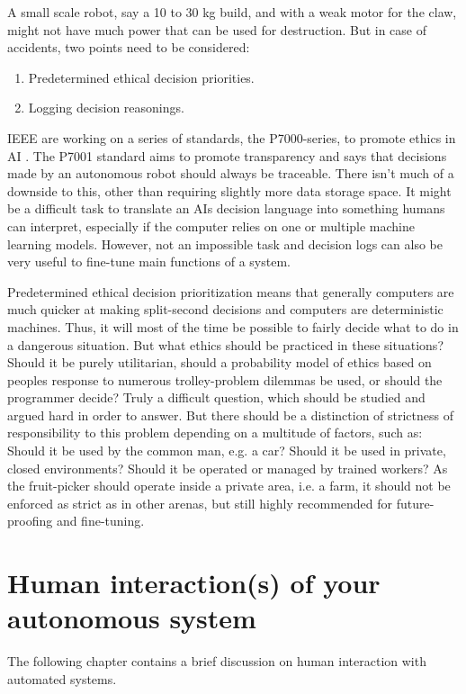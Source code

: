 \documentclass[%
oneside,    %
project,    %
nosummary   %
]{USN-MSc}
\begin{document}
A small scale robot, say a 10 to 30 kg build, and with a weak motor for the claw, might not have much power that can be used for destruction. 
But in case of accidents, two points need to be considered: 
\begin{enumerate}
  \item Predetermined ethical decision priorities.
  \item Logging decision reasonings.
\end{enumerate}

IEEE are working on a series of standards, the P7000-series, to promote ethics in AI \cite{7924235}. 
The P7001 standard aims to promote transparency and says that decisions made by an autonomous robot should always be traceable. There isn't much of a downside to this, other than requiring slightly more data storage space. It might be a difficult task to translate an AIs decision language into something humans can interpret, especially if the computer relies on one or multiple machine learning models. However, not an impossible task and decision logs can also be very useful to fine-tune main functions of a system.

Predetermined ethical decision prioritization means that generally computers are much quicker at making split-second decisions and computers are deterministic machines. Thus, it will most of the time be possible to fairly decide what to do in a dangerous situation. But what ethics should be practiced in these situations? Should it be purely utilitarian, should a probability model of ethics based on peoples response to numerous trolley-problem dilemmas be used, or should the programmer decide? Truly a difficult question, which should be studied and argued hard in order to answer. But there should be a distinction of strictness of responsibility to this problem depending on a multitude of factors, such as: Should it be used by the common man, e.g. a car? Should it be used in private, closed environments? Should it be operated or managed by trained workers? As the fruit-picker should operate inside a private area, i.e. a farm, it should not be enforced as strict as in other arenas, but still highly recommended for future-proofing and fine-tuning.

\chapter{Human interaction(s) of your autonomous system}
\label{ch:human}
The following chapter contains a brief discussion on human interaction with automated systems.
\end{document}
